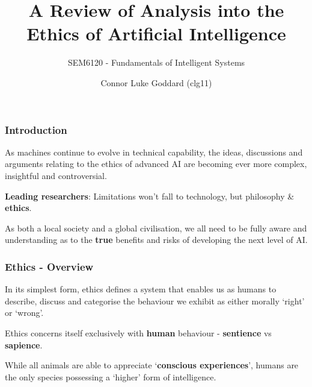 \documentclass[10pt, compress]{beamer}
\title{A Review of Analysis into the Ethics of Artificial Intelligence}
\subtitle{\small{SEM6120 - Fundamentals of Intelligent Systems}}
\author{Connor Luke Goddard (clg11)}
\institute{Aberystwyth University}
\begin{document}
\maketitle

\begin{frame}[fragile]
  \frametitle{Introduction}
  
  \small {
  
    As machines continue to evolve in technical capability, the ideas, discussions and arguments relating to the ethics of advanced AI are becoming ever more complex, insightful and controversial.
    
    \vspace{10pt}
    
    \textbf{Leading researchers}: Limitations won't fall to technology, but philosophy \& \textbf{ethics}.
    
    \vspace{10pt}
    
    As both a local society and a global civilisation, we all need to be fully aware and understanding as to the \textbf{true} benefits and risks of developing the next level of AI.
    
    }

\end{frame}

\begin{frame}[fragile]
  \frametitle{Ethics - Overview}
  
  \small{
  
    In its simplest form, ethics defines a system that enables us as humans to describe, discuss and categorise the behaviour we exhibit as either morally ‘right’ or ‘wrong’.
    
    \vspace{10pt}
    
    Ethics concerns itself exclusively with \textbf{human} behaviour - \textbf{sentience} vs \textbf{sapience}.
    
    \vspace{10pt}
    
    While all animals are able to appreciate `\textbf{conscious experiences}', humans are the only species possessing a `higher' form of intelligence.
    
    }

\end{frame}
\end{document}
